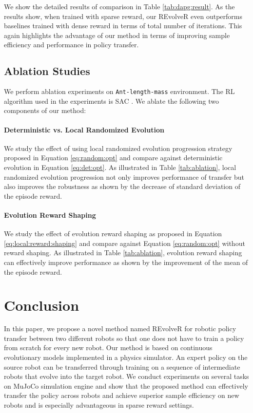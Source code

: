 \documentclass[nohyperref]{article}
\theoremstyle{plain}
\theoremstyle{definition}
\theoremstyle{remark}
\begin{document}
We show the detailed results of comparison in Table \ref{tab:dapg:result}. As the results show, when trained with sparse reward, our REvolveR even outperforms baselines trained with dense reward in terms of total number of iterations.
This again highlights the advantage of our method in terms of improving sample efficiency and performance in policy transfer.



\subsection{Ablation Studies}

We perform ablation experiments on \texttt{Ant-length-mass} environment. 
The RL algorithm used in the experiments is SAC \cite{sac}. We ablate the following two components of our method:



\paragraph{Deterministic vs. Local Randomized Evolution }
We study the effect of using local randomized evolution progression strategy proposed in Equation \eqref{eq:random:opt} and compare against deterministic evolution in Equation \eqref{eq:det:opt}.
As illustrated in Table \ref{tab:ablation}, local randomized evolution progression not only improves performance of transfer but also improves the robustness as shown by the decrease of standard deviation of the episode reward.

\paragraph{Evolution Reward Shaping }
We study the effect of evolution reward shaping as proposed in Equation \eqref{eq:local:reward:shaping} and compare against Equation \eqref{eq:random:opt} without reward shaping.
As illustrated in Table \ref{tab:ablation}, evolution reward shaping can effectively improve performance as shown by the improvement of the mean of the episode reward.



\section{Conclusion}
In this paper, we  propose a novel method named REvolveR for robotic policy transfer between two different robots so that one does not have to train a policy from scratch for every new robot.
Our method is based on continuous evolutionary models implemented in a physics simulator. 
An expert policy on the source robot can be transferred through training on a sequence of intermediate robots that evolve into the target robot.
We conduct experiments on several tasks on MuJoCo simulation engine and show that the proposed method can effectively transfer the policy across robots and achieve superior sample efficiency on new robots 
and is especially advantageous in sparse reward settings.
\end{document}
